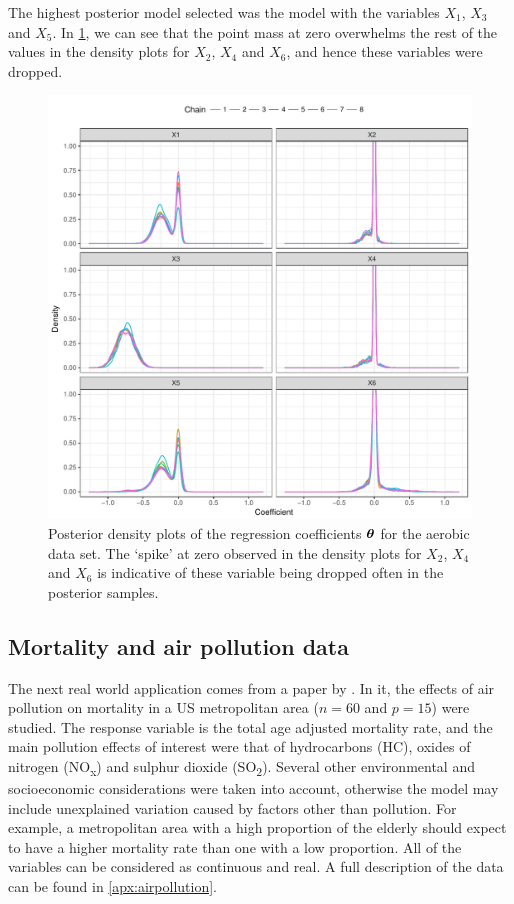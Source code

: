 \documentclass[a4paper,showframe,11pt]{report}
\begin{document}
The highest posterior model selected was the model with the variables $X_1$, $X_3$ and $X_5$.
In \cref{fig:aerobic-densplot}, we can see that the point mass at zero overwhelms the rest of the values in the density plots for $X_2$, $X_4$ and $X_6$, and hence these variables were dropped.

\begin{figure}[H]
  \centering
  \includegraphics[width=\textwidth]{figure/aerobic_coef}
  \caption[Posterior density plots of the regression coefficients for the aerobic data set.]{Posterior density plots of the regression coefficients ${\bm\theta}$ for the aerobic data set. The `spike' at zero observed in the density plots for $X_2$, $X_4$ and $X_6$ is indicative of these variable being dropped often in the posterior samples.}
  \label{fig:aerobic-densplot}
\end{figure}

\subsection{Mortality and air pollution data}
\label{sec:airpollution}

The next real world application comes from a paper by \citet{McDonald1973}. 
In it, the effects of air pollution on mortality in a US metropolitan area ($n=60$ and $p=15$) were studied. 
The response variable is the total age adjusted mortality rate, and the main pollution effects of interest were that of hydrocarbons (HC), oxides of nitrogen (NO\textsubscript{x}) and sulphur dioxide (SO\textsubscript{2}). 
Several other environmental and socioeconomic considerations were taken into account, otherwise the model may include unexplained variation caused by factors other than pollution. 
For example, a metropolitan area with a high proportion of the elderly should expect to have a higher mortality rate than one with a low proportion. 
All of the variables can be considered as continuous and real. 
A full description of the data can be found in \cref{apx:airpollution}. 
\end{document}
